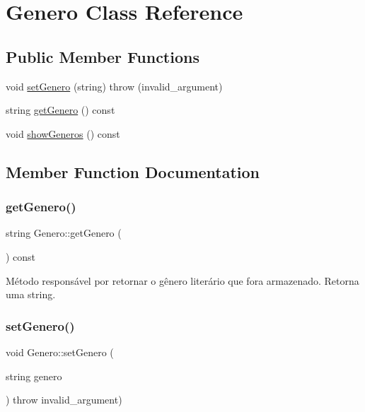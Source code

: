 \hypertarget{classGenero}{}\section{Genero Class Reference}
\label{classGenero}
\subsection*{Public Member Functions}
\begin{DoxyCompactItemize}
\item 
void \hyperlink{classGenero_adc53f59f5147fb37da8782378cffda9c}{set\+Genero} (string)  throw (invalid\+\_\+argument)
\item 
string \hyperlink{classGenero_aa2a093d178f71b41a07b2b497494e7b4}{get\+Genero} () const
\item 
void \hyperlink{classGenero_a1f7c047f6d2c5b75520673a5c3cca6a6}{show\+Generos} () const
\end{DoxyCompactItemize}


\subsection{Member Function Documentation}
\mbox{\label{classGenero_aa2a093d178f71b41a07b2b497494e7b4}} 
\subsubsection{\texorpdfstring{get\+Genero()}{getGenero()}}
{\footnotesize\ttfamily string Genero\+::get\+Genero (\begin{DoxyParamCaption}{ }\end{DoxyParamCaption}) const\hspace{0.3cm}{\ttfamily [inline]}}

Método responsável por retornar o gênero literário que fora armazenado. Retorna uma string. \mbox{\label{classGenero_adc53f59f5147fb37da8782378cffda9c}} 
\subsubsection{\texorpdfstring{set\+Genero()}{setGenero()}}
{\footnotesize\ttfamily void Genero\+::set\+Genero (\begin{DoxyParamCaption}\item[{string}]{genero }\end{DoxyParamCaption}) throw  invalid\+\_\+argument) }

